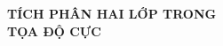 \documentclass[preview]{standalone}
\begin{document}
\begin{center}
\textbf{TÍCH PHÂN HAI LỚP TRONG \\TỌA ĐỘ CỰC}
\end{center}
\end{document}
